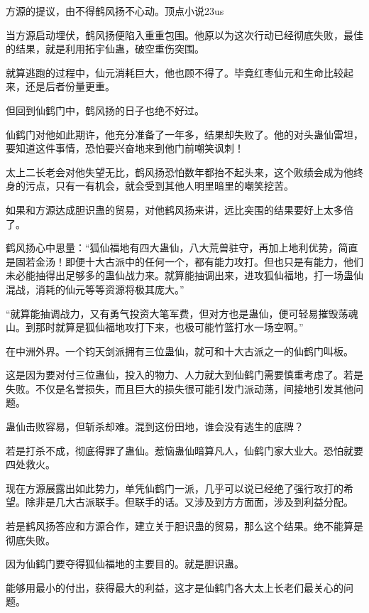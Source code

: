 
\begin{this_body}

方源的提议，由不得鹤风扬不心动。顶点小说23us

当方源启动埋伏，鹤风扬便陷入重重包围。他原以为这次行动已经彻底失败，最佳的结果，就是利用拓宇仙蛊，破空重伤突围。

就算逃跑的过程中，仙元消耗巨大，他也顾不得了。毕竟红枣仙元和生命比较起来，还是后者份量更重。

但回到仙鹤门中，鹤风扬的日子也绝不好过。

仙鹤门对他如此期许，他充分准备了一年多，结果却失败了。他的对头蛊仙雷坦，要知道这件事情，恐怕要兴奋地来到他门前嘲笑讽刺！

太上二长老会对他失望无比，鹤风扬恐怕数年都抬不起头来，这个败绩会成为他终身的污点，只有一有机会，就会受到其他人明里暗里的嘲笑挖苦。

如果和方源达成胆识蛊的贸易，对他鹤风扬来讲，远比突围的结果要好上太多倍了。

鹤风扬心中思量：“狐仙福地有四大蛊仙，八大荒兽驻守，再加上地利优势，简直是固若金汤！即便十大古派中的任何一个，都有能力攻打。但也只是有能力，他们未必能抽得出足够多的蛊仙战力来。就算能抽调出来，进攻狐仙福地，打一场蛊仙混战，消耗的仙元等等资源将极其庞大。”

“就算能抽调战力，又有勇气投资大笔军费，但对方也是蛊仙，便可轻易摧毁荡魂山。到那时就算是狐仙福地攻打下来，也极可能竹篮打水一场空啊。”

在中洲外界。一个钧天剑派拥有三位蛊仙，就可和十大古派之一的仙鹤门叫板。

这是因为要对付三位蛊仙，投入的物力、人力就大到仙鹤门需要慎重考虑了。若是失败。不仅是名誉损失，而且巨大的损失很可能引发门派动荡，间接地引发其他问题。

蛊仙击败容易，但斩杀却难。混到这份田地，谁会没有逃生的底牌？

若是打杀不成，彻底得罪了蛊仙。惹恼蛊仙暗算凡人，仙鹤门家大业大。恐怕就要四处救火。

现在方源展露出如此势力，单凭仙鹤门一派，几乎可以说已经绝了强行攻打的希望。除非是几大古派联手。但联手的话。又涉及到方方面面，涉及到利益分配。

若是鹤风扬答应和方源合作，建立关于胆识蛊的贸易，那么这个结果。绝不能算是彻底失败。

因为仙鹤门要夺得狐仙福地的主要目的。就是胆识蛊。

能够用最小的付出，获得最大的利益，这才是仙鹤门各大太上长老们最关心的问题。


\end{this_body}
